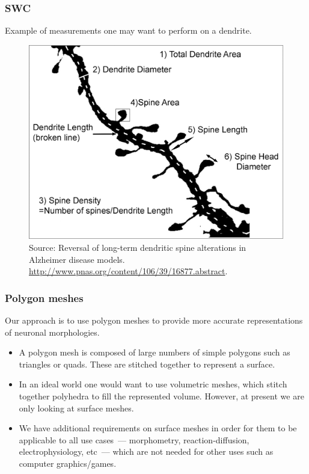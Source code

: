 \documentclass{beamer}
\begin{document}
\begin{frame}
\frametitle{SWC}

Example of measurements one may want to perform on a dendrite.

\begin{figure}[H]
    \centering
    \includegraphics[scale=0.1]{../blog/images/F1_large}
    \caption{Source: Reversal of long-term dendritic spine alterations in Alzheimer disease models.
      \url{http://www.pnas.org/content/106/39/16877.abstract}.}
    \label{fig:morphometry}
\end{figure}

\end{frame}

\begin{frame}
\frametitle{Polygon meshes}

Our approach is to use polygon meshes to provide more accurate
representations of neuronal morphologies.

\pause

\begin{itemize}
\item A polygon mesh is composed of large numbers of simple polygons
  such as triangles or quads. These are stitched together to represent
  a surface.
\pause
\item In an ideal world one would want to use volumetric meshes, which
  stitch together polyhedra to fill the represented volume. However,
  at present we are only looking at surface meshes.
\pause
\item We have additional requirements on surface meshes in order for
  them to be applicable to all use cases~--- morphometry,
  reaction-diffusion, electrophysiology, etc~--- which are not needed
  for other uses such as computer graphics/games.
\end{itemize}

\end{frame}
\end{document}
